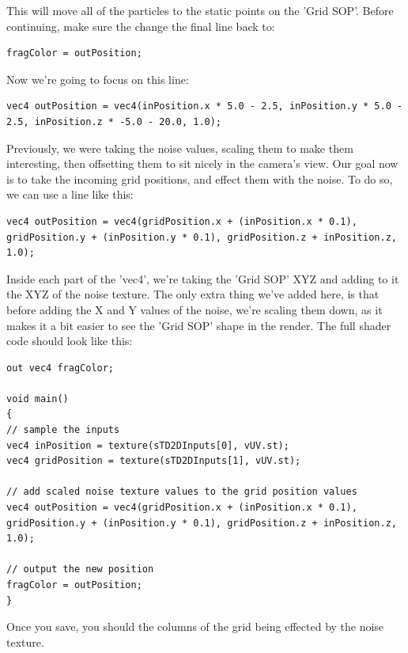 \begin{fullwidth}
This will move all of the particles to the static points on the 'Grid SOP'. Before continuing, make sure the change the final line back to:

\begin{lstlisting}
fragColor = outPosition;
\end{lstlisting}

Now we're going to focus on this line:

\begin{lstlisting}
vec4 outPosition = vec4(inPosition.x * 5.0 - 2.5, inPosition.y * 5.0 - 2.5, inPosition.z * -5.0 - 20.0, 1.0);
\end{lstlisting}

Previously, we were taking the noise values, scaling them to make them interesting, then offsetting them to sit nicely in the camera's view. Our goal now is to take the incoming grid positions, and effect them with the noise. To do so, we can use a line like this:

\begin{lstlisting}
vec4 outPosition = vec4(gridPosition.x + (inPosition.x * 0.1), gridPosition.y + (inPosition.y * 0.1), gridPosition.z + inPosition.z, 1.0);
\end{lstlisting}

Inside each part of the 'vec4', we're taking the 'Grid SOP' XYZ and adding to it the XYZ of the noise texture. The only extra thing we've added here, is that before adding the X and Y values of the noise, we're scaling them down, as it makes it a bit easier to see the 'Grid SOP' shape in the render. The full shader code should look like this:

\begin{lstlisting}
out vec4 fragColor;

void main()
{
// sample the inputs
vec4 inPosition = texture(sTD2DInputs[0], vUV.st);
vec4 gridPosition = texture(sTD2DInputs[1], vUV.st);

// add scaled noise texture values to the grid position values
vec4 outPosition = vec4(gridPosition.x + (inPosition.x * 0.1), gridPosition.y + (inPosition.y * 0.1), gridPosition.z + inPosition.z, 1.0);

// output the new position
fragColor = outPosition;
}
\end{lstlisting}


Once you save, you should the columns of the grid being effected by the noise texture.


\end{fullwidth}
